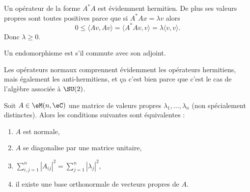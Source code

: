 \begin{remark}      \label{REMooMLBCooTuKFmz}
    Un opérateur de la forme \( A^*A\) est évidemment hermitien. De plus ses valeurs propres sont toutes positives parce que si \( A^*Ax=\lambda v\) alors
    \begin{equation}
        0\leq \langle Av, Av\rangle =\langle A^*Av, v\rangle =\lambda\langle v, v\rangle .
    \end{equation}
    Donc \( \lambda\geq 0\).
\end{remark}

\begin{definition}  \label{DefWQNooKEeJzv}
    Un endomorphisme est  s'il commute avec son adjoint.
\end{definition}

Les opérateurs normaux comprennent évidemment les opérateurs hermitiens, mais également les anti-hermitiens, et ça c'est bien parce que c'est le cas de l'algèbre associée à \( \SU(2)\).

\begin{theorem}    \label{ThogammwA}
    Soit \( A\in\eM(n,\eC)\) une matrice de valeurs propres \( \lambda_1,\ldots, \lambda_n\) (non spécialement distinctes). Alors les conditions suivantes sont équivalentes :
    \begin{enumerate}
        \item   \label{ItemJZhFPSi}
            \( A\) est normale,
        \item   \label{ItemJZhFPSii}
            \( A\) se diagonalise par une matrice unitaire,
        \item
            \( \sum_{i,j=1}^n| A_{ij} |^2=\sum_{j=1}^n| \lambda_j |^2\),
        \item
            il existe une base orthonormale de vecteurs propres de \( A\).
    \end{enumerate}
\end{theorem}

